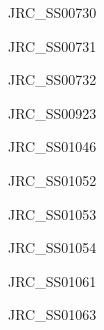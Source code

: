 \documentclass[17pt]{extarticle}
\begin{document}
\bf
\vspace*{-0.15cm}
\begin{large}
JRC\_SS00730 \\[0.5em]
\end{large}

\newpage\vspace*{-0.15cm}
\begin{large}
JRC\_SS00731 \\[0.5em]
\end{large}

\newpage\vspace*{-0.15cm}
\begin{large}
JRC\_SS00732 \\[0.5em]
\end{large}

\newpage\vspace*{-0.15cm}
\begin{large}
JRC\_SS00923 \\[0.5em]
\end{large}

\newpage\vspace*{-0.15cm}
\begin{large}
JRC\_SS01046 \\[0.5em]
\end{large}

\newpage\vspace*{-0.15cm}
\begin{large}
JRC\_SS01052 \\[0.5em]
\end{large}

\newpage\vspace*{-0.15cm}
\begin{large}
JRC\_SS01053 \\[0.5em]
\end{large}

\newpage\vspace*{-0.15cm}
\begin{large}
JRC\_SS01054 \\[0.5em]
\end{large}

\newpage\vspace*{-0.15cm}
\begin{large}
JRC\_SS01061 \\[0.5em]
\end{large}

\newpage\vspace*{-0.15cm}
\begin{large}
JRC\_SS01063 \\[0.5em]
\end{large}
\end{document}
